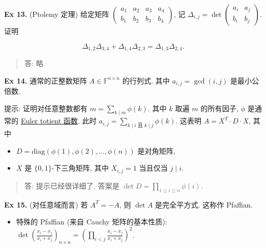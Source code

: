 \documentclass[
]{ctexart}
\begin{document}
\textbf{Ex 13.} (Ptolemy 定理) 给定矩阵
\(\begin{pmatrix}a_1&a_2&a_3&a_4\\b_1&b_2&b_3&b_4\end{pmatrix}\), 记
\(\Delta_{i,j}=\det \begin{pmatrix}a_i&a_j\\b_i&b_j\end{pmatrix}\). 证明

\[\Delta_{1,2}\Delta_{3,4}+\Delta_{1,4}\Delta_{2,3}=\Delta_{1,3}\Delta_{2,4}.\]

\begin{quote}
答: 略.
\end{quote}

\textbf{Ex 14.} 通常的正整数矩阵 \(A\in \mathbb F^{n\times n}\)
的行列式. 其中 \(a_{i,j}=\gcd (i,j)\) 是最小公倍数.

提示: 证明对任意整数都有 \(m=\sum_{k\mid m}\phi (k)\). 其中 \(k\) 取遍
\(m\) 的所有因子, \(\phi\) 是通常的
\href{https://en.wikipedia.org/wiki/Euler\%27s_totient_function}{Euler
totient 函数}. 此时
\(a_{i,j}=\sum_{k\mid i \text{ 且 }k \mid j}\phi (k)\). 这表明
\(A=X^T\cdot D\cdot X\), 其中

\begin{itemize}
\item
  \(D=\mathrm{diag}(\phi(1),\phi(2),\ldots, \phi (n))\) 是对角矩阵,
\item
  \(X\) 是 \(\{0,1\}\)-下三角矩阵, 其中 \(X_{i,j}=1\) 当且仅当
  \(j\mid i\).
\end{itemize}

\begin{quote}
答: 提示已经很详细了. 答案是 \(\det D=\prod_{1\leq i\leq n}\phi (i)\).
\end{quote}

\textbf{Ex 15.} (对任意域而言) 若 \(A^T=-A\), 则 \(\det A\)
是完全平方式. 这称作 Pfaffian.

\begin{itemize}
\item
  特殊的 Pfaffian (来自 Cauchy 矩阵的基本性质):
  \(\det \left(\frac{x_i-x_j}{x_i+x_j}\right)_{n\times n}=\left(\prod_{i<j}\frac{x_i-x_j}{x_i+x_j}\right)^2\).
\end{itemize}
\end{document}
